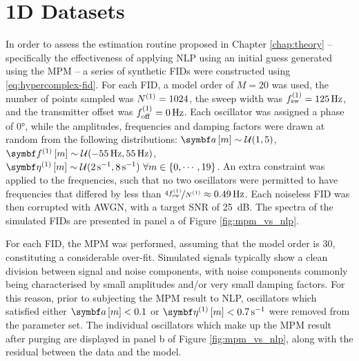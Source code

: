 \section{\acs{1D} Datasets}

In order to assess the estimation routine proposed in Chapter \ref{chap:theory}
-- specifically the effectiveness of applying \ac{NLP} using an initial guess
generated using the \ac{MPM} -- a series of synthetic \acp{FID} were constructed
using \eqref{eq:hypercomplex-fid}. For each \ac{FID}, a model order of $M=20$
was used, the number of points sampled was $N^{(1)} = 1024$, the sweep width
was $f_{\mathrm{sw}}^{(1)}=\qty{125}{\hertz}$, and the transmitter offset was $f_{\mathrm{off}}^{(1)} =
\qty{0}{\hertz}$.  Each oscillator was assigned a phase of \ang{0}, while the
amplitudes, frequencies and damping factors were drawn at random from the
following distributions:
$\bdam \sim \mathcal{U}(1, 5)$, $\bdfonem \sim \mathcal{U}(\qty{-55}{\hertz},
\qty{55}{\hertz})$, $\bdetaonem \sim \mathcal{U}(\qty{2}{\per\second},
\qty{8}{\per\second})\ \forall m \in \lbrace 0, \cdots, 19\rbrace$. An extra
constraint was applied to the frequencies,
such that no two oscillators were permitted to have frequencies that differed
by less than $\nicefrac{4 f_{\mathrm{sw}}^{(1)}}{N^{(1)}} \approx \qty{0.49}{\hertz}$. Each
noiseless \ac{FID} was then corrupted with \ac{AWGN}, with a target \ac{SNR} of
\qty{25}{\deci\bel}. The spectra of the simulated
\acp{FID} are presented in panel a of Figure \ref{fig:mpm_vs_nlp}.

For each \ac{FID}, the \ac{MPM} was performed, assuming that the model order is
30, constituting a considerable over-fit. Simulated signals typically show a
clean division between signal and noise components, with noise components
commonly being characterised by small amplitudes and/or very small damping
factors. For this reason, prior to subjecting the \ac{MPM} result to \ac{NLP},
oscillators which satisfied either $\bdam < 0.1$ or  $\bdetaonem <
\qty{0.7}{\per\second}$ were removed from the parameter set. The individual
oscillators which make up the \ac{MPM} result after purging are displayed in panel b of
Figure \ref{fig:mpm_vs_nlp}, along with the residual between the data and the
model.

